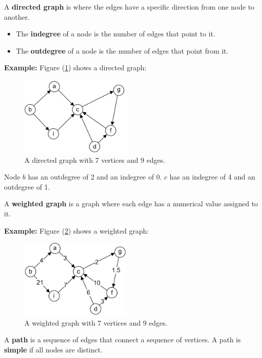 \begin{Def}

    A \textbf{directed graph} is where the edges have a specific direction from one node to another.
    \begin{itemize}
        \item  The \textbf{indegree} of a node is the number of edges that point to it.
        \item The \textbf{outdegree} of a node is the number of edges that point from it.
    \end{itemize}
\end{Def}
\noindent
\textbf{Example:} Figure (\ref{fig:dir_graph}) shows a directed graph:\\
\begin{figure}[h]
    \begin{center}
      \includegraphics[height=1.5in]{./Sections/graphs/dir_graph.png}
    \end{center}
     \caption{A directed graph with 7 vertices and 9 edges.}\label{fig:dir_graph}
  \end{figure}

  \noindent
    Node $b$ has an outdegree of 2 and an indegree of 0. $c$ has an indegree of 4 and an outdegree of 1.

\begin{Def}

    A \textbf{weighted graph} is a graph where each edge has a numerical value assigned to it.
\end{Def}
\noindent
\textbf{Example:} Figure (\ref{fig:weight_graph}) shows a weighted graph:\\
\begin{figure}[h]
    \begin{center}
      \includegraphics[height=1.5in]{./Sections/graphs/weight_graph.png}
    \end{center}
     \caption{A weighted graph with 7 vertices and 9 edges.}\label{fig:weight_graph}
  \end{figure}
\newpage
\begin{Def}[Path]

    A \textbf{path} is a sequence of edges that connect a sequence of vertices. A 
    path is \textbf{simple} if all nodes are distinct.
\end{Def}

